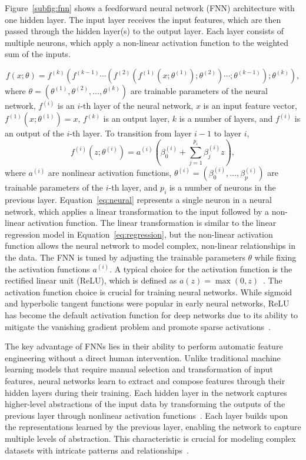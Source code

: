 Figure~\ref{subfig:fnn} shows a feedforward neural network (FNN) architecture with one hidden layer.
The input layer receives the input features, which are then passed through the hidden layer(s) to the output layer.
Each layer consists of multiple neurons, which apply a non-linear activation function to the weighted sum of the inputs.

\begin{equation}
    f(x; \theta) = f^{(k)}(f^{(k-1)} \cdots (f^{(2)}(f^{(1)}(x;\theta^{(1)});\theta^{(2)} )\cdots ;\theta^{(k-1)});\theta^{(k)}),
\end{equation}
where $\theta = (\theta^{(1)}, \theta^{(2)}, \ldots, \theta^{(k)})$ are trainable parameters of the neural network, $f^{(i)}$ is an $i$-th layer of the neural network, $x$ is an input feature vector, $f^{(1)}(x;\theta^{(1)}) = x$, $f^{(k)}$ is an output layer, $k$ is a number of layers, and $f^{(i)}$ is an output of the $i$-th layer.
To transition from layer $i-1$ to layer $i$,
\begin{equation} \label{eq:neural}
    f^{(i)}(z;\theta^{(i)}) = a^{(i)}(\beta_0^{(i)} + \sum_{j=1}^{p_i} \beta_j^{(i)} z),
\end{equation}
where $a^{(i)}$ are nonlinear activation functions, $\theta^{(i)} = (\beta_0^{(i)}, \dots, \beta_p^{(i)})$ are trainable parameters of the $i$-th layer, and $p_i$ is a number of neurons in the previous layer.
Equation~\eqref{eq:neural} represents a single neuron in a neural network, which applies a linear transformation to the input followed by a non-linear activation function.
The linear transformation is similar to the linear regression model in Equation~\eqref{eq:regression}, but the non-linear activation function allows the neural network to model complex, non-linear relationships in the data.
The FNN is tuned by adjusting the trainable parameters $\theta$ while fixing the activation functions $a^{(i)}$.
A typical choice for the activation function is the rectified linear unit (ReLU), which is defined as $a(z) = \max(0, z)$~\citep{nair2010rectified}.
The activation function choice is crucial for training neural networks.
While sigmoid and hyperbolic tangent functions were popular in early neural networks, ReLU has become the default activation function for deep networks due to its ability to mitigate the vanishing gradient problem and promote sparse activations~\citep{lecun2015deep}.

The key advantage of FNNs lies in their ability to perform automatic feature engineering without a direct human intervention.
Unlike traditional machine learning models that require manual selection and transformation of input features, neural networks learn to extract and compose features through their hidden layers during their training.
Each hidden layer in the network captures higher-level abstractions of the input data by transforming the outputs of the previous layer through nonlinear activation functions~\citep{lecun2015deep}.
Each layer builds upon the representations learned by the previous layer, enabling the network to capture multiple levels of abstraction.
This characteristic is crucial for modeling complex datasets with intricate patterns and relationships~\citep{bengio2013representation}.

